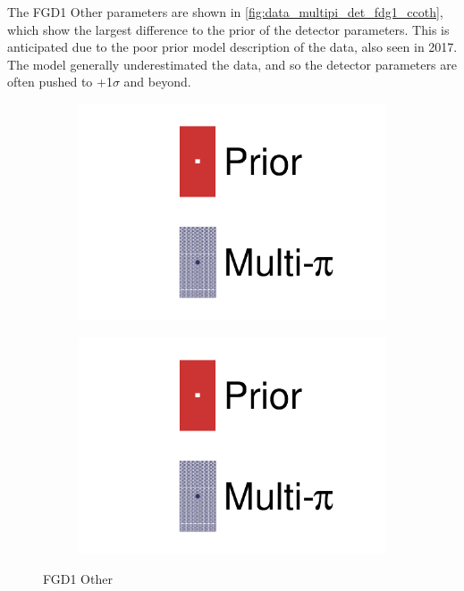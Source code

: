 The FGD1 Other parameters are shown in \autoref{fig:data_multipi_det_fdg1_ccoth}, which show the largest difference to the prior of the detector parameters. This is anticipated due to the poor prior model description of the data, also seen in 2017. The model generally underestimated the data, and so the detector parameters are often pushed to +1$\sigma$ and beyond.
\begin{figure}[h]
	\centering
	\begin{subfigure}[t]{0.32\textwidth}
		\includegraphics[width=\textwidth,page=31, trim={0mm 0mm 0mm 0mm}, clip]{figures/mach3/2018/data/2018a_FixedCov_RedCov_Mpi_Data_merge_drawPar_withDet}
	\end{subfigure}
	\begin{subfigure}[t]{0.32\textwidth}
		\includegraphics[width=\textwidth,page=32, trim={0mm 0mm 0mm 0mm}, clip]{figures/mach3/2018/data/2018a_FixedCov_RedCov_Mpi_Data_merge_drawPar_withDet}
	\end{subfigure}
	\caption{FGD1 Other}
	\label{fig:data_multipi_det_fdg1_ccoth}
\end{figure}

